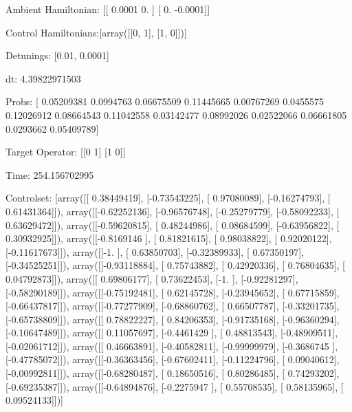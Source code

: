 \documentclass{article}
\begin{document}
    

\newpage

Ambient Hamiltonian: [[ 0.0001  0.    ]
 [ 0.     -0.0001]]

Control Hamiltonians:[array([[0, 1],
       [1, 0]])]

Detunings: [0.01, 0.0001]

 dt: 4.39822971503

Probs: [ 0.05209381  0.0994763   0.06675509  0.11445665  0.00767269  0.0455575
  0.12026912  0.08664543  0.11042558  0.03142477  0.08992026  0.02522066
  0.06661805  0.0293662   0.05409789]

Target Operator: [[0 1]
 [1 0]]

Time: 254.156702995

Controlset: [array([[ 0.38449419],
       [-0.73543225],
       [ 0.97080089],
       [-0.16274793],
       [ 0.61431364]]), array([[-0.62252136],
       [-0.96576748],
       [-0.25279779],
       [-0.58092233],
       [ 0.63629472]]), array([[-0.59620815],
       [ 0.48244986],
       [ 0.08684599],
       [-0.63956822],
       [ 0.30932925]]), array([[-0.8169146 ],
       [ 0.81821615],
       [ 0.98038822],
       [ 0.92020122],
       [-0.11617673]]), array([[-1.        ],
       [ 0.63850703],
       [-0.32389933],
       [ 0.67350197],
       [-0.34525251]]), array([[-0.93118884],
       [ 0.75743882],
       [ 0.42920336],
       [ 0.76804635],
       [ 0.04792873]]), array([[ 0.69806177],
       [ 0.73622453],
       [-1.        ],
       [-0.92281297],
       [-0.58290189]]), array([[-0.75192481],
       [ 0.62145728],
       [-0.23945652],
       [ 0.67715859],
       [-0.66437817]]), array([[-0.77277909],
       [-0.68860762],
       [ 0.66507787],
       [-0.33201735],
       [-0.65738809]]), array([[ 0.78822227],
       [ 0.84206353],
       [-0.91735168],
       [-0.96360294],
       [-0.10647489]]), array([[ 0.11057697],
       [-0.4461429 ],
       [ 0.48813543],
       [-0.48909511],
       [-0.02061712]]), array([[ 0.46663891],
       [-0.40582811],
       [-0.99999979],
       [-0.3686745 ],
       [-0.47785072]]), array([[-0.36363456],
       [-0.67602411],
       [-0.11224796],
       [ 0.09040612],
       [-0.00992811]]), array([[-0.68280487],
       [ 0.18650516],
       [ 0.80286485],
       [ 0.74293202],
       [-0.69235387]]), array([[-0.64894876],
       [-0.2275947 ],
       [ 0.55708535],
       [ 0.58135965],
       [ 0.09524133]])]
\end{document}
